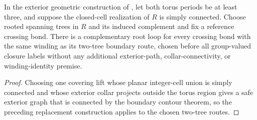 \begin{lemma}%
    \label{thm:peps_torus_simply_connected_boundary_loops}
    \leanok
    In the exterior geometric construction of
    \cite[proof of Theorem~6.9]{Schuch2010PEPS}, let both torus periods be at
    least three, and suppose the closed-cell realization of $R$ is simply
    connected. Choose rooted spanning trees in $R$ and its induced complement
    and fix a reference crossing bond. There is a complementary root loop for
    every crossing bond with the same winding as its two-tree boundary route,
    chosen before all group-valued closure labels without any additional
    exterior-path, collar-connectivity, or winding-identity premise.
\end{lemma}
\begin{proof}\leanok
    Choosing one covering lift whose planar integer-cell union is simply
    connected and whose exterior collar projects outside the torus
    region gives a safe exterior graph that is connected by the boundary contour
    theorem, so the preceding replacement construction applies to the
    chosen two-tree routes.
\end{proof}
